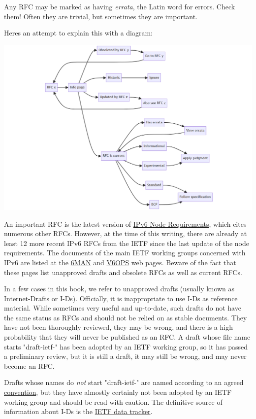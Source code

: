 \documentclass[
]{article}
\begin{document}
Any RFC may be marked as having \emph{errata}, the Latin word for
errors. Check them! Often they are trivial, but sometimes they are
important.

Here\textquotesingle s an attempt to explain this with a diagram:

\includegraphics{rfc-diagram.png}

An important RFC is the latest version of
\href{https://www.rfc-editor.org/info/bcp220}{IPv6 Node Requirements},
which cites numerous other RFCs. However, at the time of this writing,
there are already at least 12 more recent IPv6 RFCs from the IETF since
the last update of the node requirements. The documents of the main IETF
working groups concerned with IPv6 are listed at the
\href{https://datatracker.ietf.org/wg/6man/documents/}{6MAN} and
\href{https://datatracker.ietf.org/wg/v6ops/documents/}{V6OPS} web
pages. Beware of the fact that these pages list unapproved drafts and
obsolete RFCs as well as current RFCs.

In a few cases in this book, we refer to unapproved drafts (usually
known as Internet-Drafts or I-Ds). Officially, it is inappropriate to
use I-Ds as reference material. While sometimes very useful and
up-to-date, such drafts do not have the same status as RFCs and should
not be relied on as stable documents. They have not been thoroughly
reviewed, they may be wrong, and there is a high probability that they
will never be published as an RFC. A draft whose file name starts
"draft-ietf-" has been adopted by an IETF working group, so it has
passed a preliminary review, but it is still a draft, it may still be
wrong, and may never become an RFC.

Drafts whose names do \emph{not} start "draft-ietf-" are named according
to an agreed
\href{https://authors.ietf.org/naming-your-internet-draft}{convention},
but they have almostly certainly not been adopted by an IETF working
group and should be read with caution. The definitive source of
information about I-Ds is the \href{https://datatracker.ietf.org/}{IETF
data tracker}.
\end{document}
